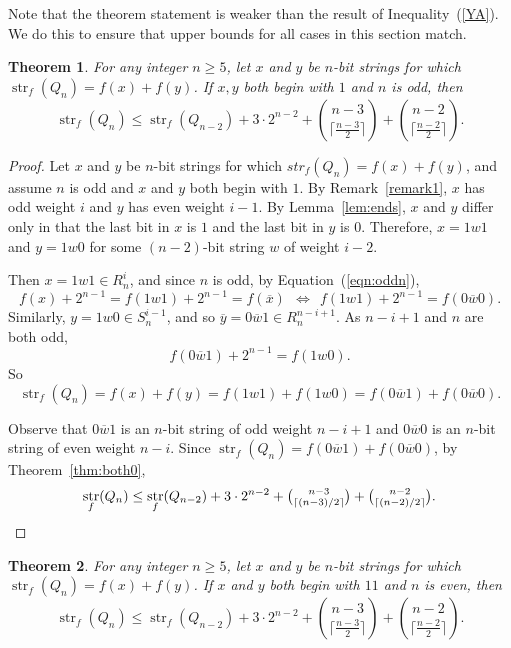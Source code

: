 \documentclass[12pt]{article}
\newtheorem{theorem}{Theorem}[section]
\DeclareMathOperator{\str}{str}
\begin{document}
Note that the theorem statement is weaker than the result of Inequality~(\ref{YA}). We do this to ensure that upper bounds for all cases in this section match. 

\begin{theorem}\label{thm:both1odd} For any integer $n \geq 5$, let $x$ and $y$ be $n$-bit strings for which $\str_f(Q_{n}) = f(x)+f(y)$.  If $x,y$ both begin with $1$ and $n$ is odd, then $$\str_f(Q_{n}) \leq \str_f(Q_{n-2}) + 3 \cdot 2^{n-2} + \binom{n-3}{\lceil \frac{n-3}{2}\rceil}+\binom{n-2}{\lceil \frac{n-2}{2}\rceil}.$$
\end{theorem}

\begin{proof} Let $x$ and $y$ be $n$-bit strings for which $str_f(Q_n) = f(x)+f(y)$, and assume $n$ is odd and $x$ and $y$ both begin with $1$. By Remark~\ref{remark1}, $x$ has odd weight $i$ and $y$ has even weight $i-1$.  By Lemma~\ref{lem:ends}, $x$ and $y$ differ only in that the last bit in $x$ is $1$ and the last bit in $y$ is $0$.  Therefore, $x = 1w1$ and $y=1w0$ for some $(n-2)$-bit string $w$ of weight $i-2$. 

Then $x = 1w1 \in R_{n}^i$, and since $n$ is odd, by Equation~(\ref{eqn:oddn}),  
$$f(x)+2^{n-1}=f(1w1) +2^{n-1} = f(\overline{x}) ~~ \Longleftrightarrow ~~ f(1w1)+2^{n-1} = f(0\overline{w}0).$$  Similarly, $y = 1w0 \in S_{n}^{i-1}$, and so $\overline{y} = 0\overline{w}1 \in R_{n}^{n-i+1}$.  As $n-i+1$ and $n$ are both odd, $$f(0\overline{w}1) + 2^{n-1} = f(1w0).$$  So $$\str_f(Q_{n}) = f(x)+f(y) = f(1w1)+f(1w0) = f(0\overline{w}1)+f(0\overline{w}0).$$

Observe that $0\overline{w}1$ is an $n$-bit string of odd weight $n-i+1$ and $0\overline{w}0$ is an $n$-bit string of even weight $n-i$. Since $\str_f(Q_{n})=f(0\overline{w}1)+f(0\overline{w}0)$, by Theorem~\ref{thm:both0},  $$\str_f(Q_{n}) \leq \str_f(Q_{n-2}) + 3 \cdot 2^{n-2} + \tbinom{n-3}{\lceil (n-3)/2\rceil}+\tbinom{n-2}{\lceil (n-2)/2\rceil}.$$\end{proof}



\begin{theorem}\label{thm:both11even} For any integer $n \geq 5$, let $x$ and $y$ be $n$-bit strings for which $\str_f(Q_{n})=f(x)+f(y)$. If $x$ and $y$ both begin with $11$ and $n$ is even, then $$\str_f(Q_{n}) \leq \str_f(Q_{n-2}) + 3 \cdot 2^{n-2} + \binom{n-3}{\lceil \frac{n-3}{2} \rceil}+\binom{n-2}{\lceil \frac{n-2}{2}\rceil}.$$ \end{theorem} 
\end{document}
